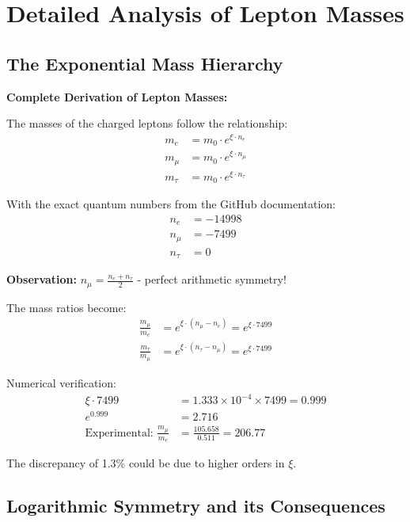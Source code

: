 \documentclass[12pt,a4paper]{article}
\newcommand{\xipar}{\xi}
\begin{document}
	\section{Detailed Analysis of Lepton Masses}
	
	\subsection{The Exponential Mass Hierarchy}
	
	\begin{relation}
		\textbf{Complete Derivation of Lepton Masses:}
		
		The masses of the charged leptons follow the relationship:
		\begin{align}
			m_e &= m_0 \cdot e^{\xipar \cdot n_e} \\
			m_\mu &= m_0 \cdot e^{\xipar \cdot n_\mu} \\
			m_\tau &= m_0 \cdot e^{\xipar \cdot n_\tau}
		\end{align}
		
		With the exact quantum numbers from the GitHub documentation:
		\begin{align}
			n_e &= -14998 \\
			n_\mu &= -7499 \\
			n_\tau &= 0
		\end{align}
		
		\textbf{Observation:} $n_\mu = \frac{n_e + n_\tau}{2}$ - perfect arithmetic symmetry!
		
		The mass ratios become:
		\begin{align}
			\frac{m_\mu}{m_e} &= e^{\xipar \cdot (n_\mu - n_e)} = e^{\xipar \cdot 7499} \\
			\frac{m_\tau}{m_\mu} &= e^{\xipar \cdot (n_\tau - n_\mu)} = e^{\xipar \cdot 7499}
		\end{align}
		
		Numerical verification:
		\begin{align}
			\xipar \cdot 7499 &= 1.333 \times 10^{-4} \times 7499 = 0.999 \\
			e^{0.999} &= 2.716 \\
			\text{Experimental: } \frac{m_\mu}{m_e} &= \frac{105.658}{0.511} = 206.77
		\end{align}
		
		The discrepancy of 1.3\% could be due to higher orders in $\xipar$.
	\end{relation}
	
	\subsection{Logarithmic Symmetry and its Consequences}
	
\end{document}
